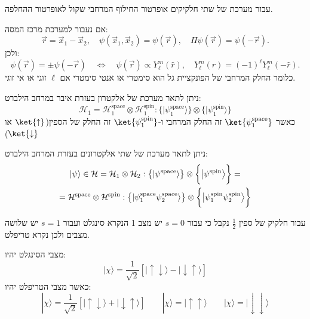 \documentclass{tstextbook}
\begin{document}
\begin{proposition}
עבור מערכת של שתי חלקיקים אופרטור החילוף המרחבי שקול לאופרטור ההחלפה.

\end{proposition}
\begin{corollary}
אם נעבור למערכת מרכז המסה:
$$\vec{r}=\vec{x}_{1}-\vec{x}_{2},\quad\psi\left( \vec{x}_{1},\vec{x}_{2} \right)=\psi\left( \vec{r} \right),\quad\Pi\psi\left( \vec{r} \right)=\psi\left( -\vec{r} \right).$$
ולכן:
$$\psi(\vec{r})=\pm\psi(-\vec{r})\quad\Leftrightarrow\quad\psi(\vec{r})\propto Y_{\ell}^{m}(\hat{r}),\quad Y_{\ell}^{m}(\hat{r})=(-1)^{\ell}Y_{\ell}^{m}(-\hat{r}).$$
כלומר החלק המרחבי של הפונקציית גל הוא סימטרי או אנטי סימטרי אם \(\ell\) זוגי או אי זוגי.

\end{corollary}
\begin{proposition}
ניתן לתאר מערכת של אלקטרון בעזרת איבר במרחב הילברט:
$${\mathcal{H}}_{1}={\mathcal{H}}_{1}^{\mathrm{space}}\otimes{\mathcal{H}}_{1}^{\mathrm{spin}}:\big\{|\psi_{1}^{\mathrm{space}}\rangle\big\}\otimes\Big\{\Big|\psi_{1}^{\mathrm{spin}}\Big\rangle\Big\}$$
כאשר \(\ket{\psi_{1}^{\mathrm{space}}}\) זה החלק המרחבי ו-\(\ket{\psi_{1}^{\mathrm{spin}}}\) זה החלק של הספין(\(\ket{\uparrow}\) או \(\ket{\downarrow}\))

\end{proposition}
\begin{corollary}
ניתן לתאר מערכת של שתי אלקטרונים בעזרת המרחב הילברט:
$$\begin{gather}|\psi\rangle\in\mathcal{H}=\mathcal{H}_{1}\otimes\mathcal{H}_{2}:\big{\{}|\psi^{\mathrm{space}}\rangle\big{\}}\otimes\bigg{\{}\big{|}\psi^{\mathrm{spin}}\big{\rangle}\bigg{\}}=\\=\mathcal{H}^{\mathrm{space}}\otimes\mathcal{H}^{\mathrm{spin}}:\big{\{}|\psi_{1}^{\mathrm{space}}\psi_{2}^{\mathrm{space}}\rangle\big{\}}\otimes\bigg{\{}\big{|}\psi_{1}^{\mathrm{spin}}\psi_{2}^{\mathrm{spin}}\big{\rangle}\bigg{\}} 
\end{gather}$$

\end{corollary}
\begin{definition}
עבור חלקיק של ספין \(\frac{1}{2}\) נקבל כי עבור \(s=0\) יש מצב 1 הנקרא סינגלט ועבור \(s=1\) יש שלושה מצבים ולכן נקרא טריפלט.

\end{definition}
\begin{proposition}
מצבי הסינגלט יהיו:
$$|\chi\rangle=\frac{1}{\sqrt{2}}[|\uparrow\downarrow\rangle-|\downarrow\uparrow\rangle]$$
כאשר מצבי הטריפלט יהיו:
$$|\chi\rangle=\frac{1}{\sqrt{2}}\left[ |\uparrow\downarrow\rangle+|\downarrow\uparrow\rangle \right]\qquad |\chi\rangle=|\uparrow\uparrow\rangle\qquad |\chi\rangle=|\downarrow\downarrow\rangle$$

\end{proposition}
\end{document}
